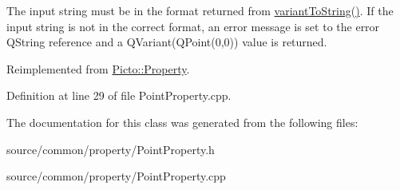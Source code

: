 The input string must be in the format returned from \hyperlink{class_picto_1_1_point_property_ab9a69b56cc879ad73c74c8830e70fe34}{variant\-To\-String()}. If the input string is not in the correct format, an error message is set to the error Q\-String reference and a Q\-Variant(Q\-Point(0,0)) value is returned. 

Reimplemented from \hyperlink{class_picto_1_1_property_a97d52011d6db190c5c28a21d76ac1d3b}{Picto\-::\-Property}.



Definition at line 29 of file Point\-Property.\-cpp.



The documentation for this class was generated from the following files\-:\begin{DoxyCompactItemize}
\item 
source/common/property/Point\-Property.\-h\item 
source/common/property/Point\-Property.\-cpp\end{DoxyCompactItemize}
